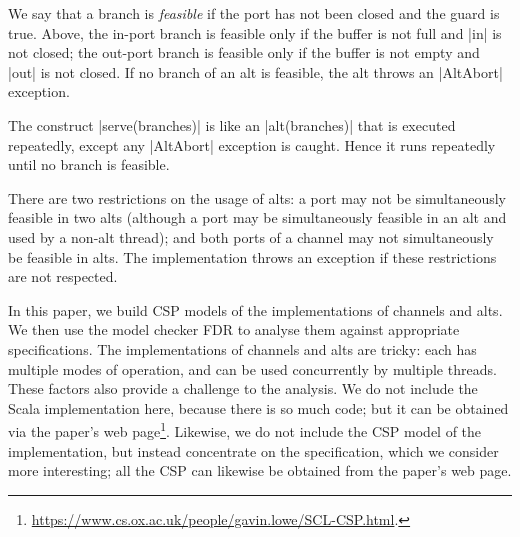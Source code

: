 We say that a branch is \emph{feasible} if the port has not been closed and
the guard is true.  Above, the in-port branch is feasible only if the buffer is
not full and |in| is not closed; the out-port branch is feasible only if the
buffer is not empty and |out| is not closed.  If no branch of an alt is
feasible, the alt throws an |AltAbort| exception.

The construct |serve(branches)| is like an |alt(branches)| that is executed
repeatedly, except any |AltAbort| exception is caught.  Hence it runs
repeatedly until no branch is feasible. 

There are two restrictions on the usage of alts: a port may not be
simultaneously feasible in two alts (although a port may be simultaneously
feasible in an alt and used by a non-alt thread); and both ports of a channel
may not simultaneously be feasible in alts.  The implementation throws an
exception if these restrictions are not respected.

In this paper, we build CSP models of the implementations of channels and
alts.  We then use the model checker FDR to analyse them against appropriate
specifications. 
%
The implementations of channels and alts are tricky: each has multiple modes
of operation, and can be used concurrently by multiple threads.  These factors
also provide a challenge to the analysis.
%
We do not include the Scala implementation here, because there is so much
code; but it can be obtained via the paper's web
page\footnote{\url{https://www.cs.ox.ac.uk/people/gavin.lowe/SCL-CSP.html}.}. 
Likewise, we do not include the CSP model of the implementation, but instead
concentrate on the specification, which we consider more interesting; all the
CSP can likewise be obtained from the paper's web page.

